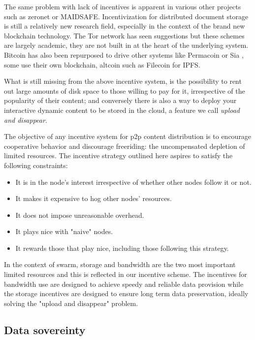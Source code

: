 The same problem with lack of incentives is apparent in various other projects such as zeronet or MAIDSAFE. Incentivization for distributed document storage is still a relatively new research field, especially in the context of the brand new blockchain technology. The Tor network has seen suggestions \cite{jansen2014onions,hoshetal2014tor} but these schemes are largely academic, they are not built in at the heart of the underlying system. Bitcoin has also been repurposed to drive other systems like Permacoin \cite{miller2014permacoin} or Sia \cite{vorick2014sia}, some use their own blockchain, altcoin  such  as Filecoin \cite{filecoin2014} for IPFS.

What is still missing from the above incentive system, is the possibility to rent out large amounts of disk space to those willing to pay for it, irrespective of the popularity of their content; and conversely there is also a way to deploy your interactive dynamic content to be stored in the cloud, a feature we call \emph{upload and disappear}.

The objective of any incentive system for p2p content distribution is to encourage cooperative behavior and discourage freeriding: the uncompensated depletion of limited resources. The incentive strategy outlined here aspires to satisfy the following constraints:

\begin{itemize}
    \item  It is in the node's interest irrespective of whether other nodes follow it or not.
    \item It makes it expensive to hog other nodes' resources.
    \item It does not impose unreasonable overhead.
    \item It plays nice with "naive" nodes.
    \item It rewards those that play nice, including those following this strategy.
\end{itemize}

In the context of swarm, storage and bandwidth are the two most important limited resources and this is reflected in our incentive scheme. The incentives for bandwidth use are designed to achieve speedy and reliable data provision while the storage incentives are designed to ensure long term data preservation, ideally solving the "upload and disappear" problem.

\subsection{Data  sovereinty}


